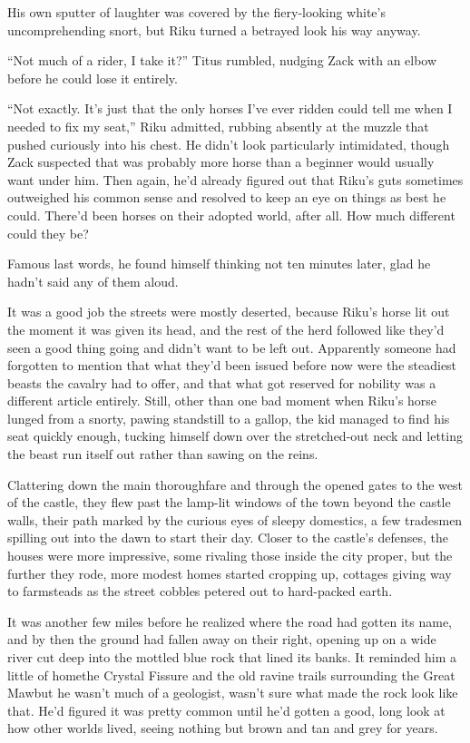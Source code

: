 His own sputter of laughter was covered by the fiery-looking white's uncomprehending snort, but Riku turned a betrayed look his way anyway.

``Not much of a rider, I take it?'' Titus rumbled, nudging Zack with an elbow before he could lose it entirely.

``Not exactly. It's just that the only horses I've ever ridden could tell me when I needed to fix my seat,'' Riku admitted, rubbing absently at the muzzle that pushed curiously into his chest. He didn't look particularly intimidated, though Zack suspected that was probably more horse than a beginner would usually want under him. Then again, he'd already figured out that Riku's guts sometimes outweighed his common sense and resolved to keep an eye on things as best he could. There'd been horses on their adopted world, after all. How much different could they be?

\scenechange

Famous last words, he found himself thinking not ten minutes later, glad he hadn't said any of them aloud.

It was a good job the streets were mostly deserted, because Riku's horse lit out the moment it was given its head, and the rest of the herd followed like they'd seen a good thing going and didn't want to be left out. Apparently someone had forgotten to mention that what they'd been issued before now were the steadiest beasts the cavalry had to offer, and that what got reserved for nobility was a different article entirely. Still, other than one bad moment when Riku's horse lunged from a snorty, pawing standstill to a gallop, the kid managed to find his seat quickly enough, tucking himself down over the stretched-out neck and letting the beast run itself out rather than sawing on the reins.

Clattering down the main thoroughfare and through the opened gates to the west of the castle, they flew past the lamp-lit windows of the town beyond the castle walls, their path marked by the curious eyes of sleepy domestics, a few tradesmen spilling out into the dawn to start their day. Closer to the castle's defenses, the houses were more impressive, some rivaling those inside the city proper, but the further they rode, more modest homes started cropping up, cottages giving way to farmsteads as the street cobbles petered out to hard-packed earth.

It was another few miles before he realized where the road had gotten its name, and by then the ground had fallen away on their right, opening up on a wide river cut deep into the mottled blue rock that lined its banks. It reminded him a little of home\textemdash the Crystal Fissure and the old ravine trails surrounding the Great Maw\textemdash but he wasn't much of a geologist, wasn't sure what made the rock look like that. He'd figured it was pretty common until he'd gotten a good, long look at how other worlds lived, seeing nothing but brown and tan and grey for years.

